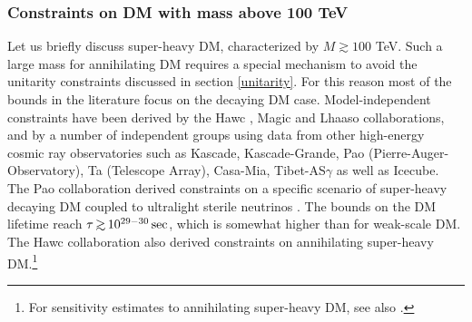 \subsubsection{Constraints on DM with mass above 100 TeV}\label{sec:IDconstraints100-TeV}
Let us briefly discuss super-heavy DM, characterized by
$M \gtrsim 100$ TeV. 
Such a large mass for annihilating DM requires a special mechanism to avoid the unitarity constraints discussed in section \ref{unitarity}. For this reason most of the bounds in the literature focus on the decaying DM case.
Model-independent constraints have been derived by the {\sc Hawc} \cite{HAWC:2017udy,HAWC:2023owv,Albert:2023ucd}, {\sc Magic} \cite{MAGIC:2018tuz} and {\sc Lhaaso} \cite{Cao:2022myt} collaborations, and by a number of independent groups \cite{Kalashev:2016cre,1612.05638,Kachelriess:2018rty,Ishiwata:2019aet,Esmaili:2021yaw,Chianese:2021jke} using data from other high-energy cosmic ray observatories such as {\sc Kascade}, {\sc Kascade-Grande}, {\sc Pao} (Pierre-Auger-Observatory), {\sc Ta} (Telescope Array), {\sc Casa-Mia}, {\sc Tibet-AS$\gamma$} as well as {\sc Icecube}.  
The {\sc Pao} collaboration derived constraints on a specific scenario of super-heavy decaying DM coupled to ultralight sterile neutrinos \cite{PierreAuger:2023vql}. 
The bounds on the DM lifetime reach $\tau\circa{>} 10^{29-30}\sec$, which is somewhat higher than for weak-scale DM.
The {\sc Hawc} \cite{HAWC:2017udy,Acharyya:2023ptu,HAWC:2023owv} collaboration also derived constraints on annihilating super-heavy DM.\footnote{For sensitivity estimates to annihilating super-heavy DM, see also \cite{Tak:2022vkb}.}
  


